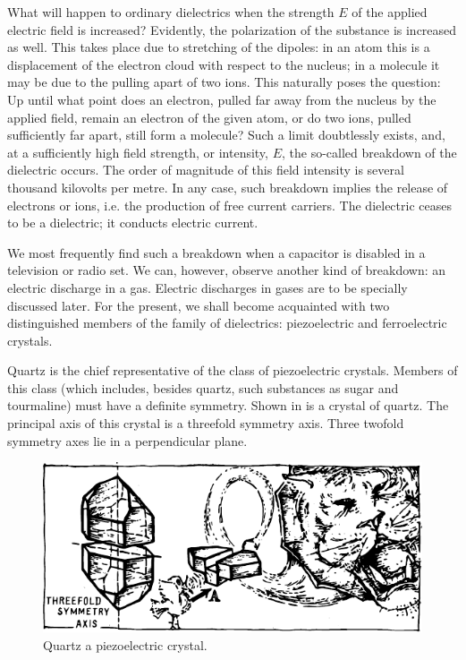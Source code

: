 What will happen to ordinary dielectrics when the strength $E$ of the applied electric field is increased? Evidently, the polarization of the substance is increased as well. This takes place due to stretching of the dipoles: in an atom this is a displacement of the electron cloud with respect to the nucleus; in a molecule it may be due to the pulling apart of two ions. This naturally poses the question: Up until what point does an electron, pulled far away from the nucleus by the applied field, remain an electron of the given atom, or do two ions, pulled sufficiently far apart, still form a molecule? Such a limit doubtlessly exists, and, at a sufficiently high field strength, or intensity, $E$, the so-called breakdown of the dielectric occurs. The order of magnitude of this field intensity is several thousand kilovolts per metre. In any case, such breakdown implies the release of electrons or ions, i.e. the production of free current carriers. The dielectric ceases to be a dielectric; it conducts electric current.

We most frequently find such a breakdown when a capacitor is disabled in a television or radio set. We can, however, observe another kind of breakdown: an electric discharge in a gas. Electric discharges in gases are to be specially discussed later. For the present, we shall become acquainted with two distinguished members of the family of dielectrics: piezoelectric and ferroelectric crystals.

Quartz is the chief representative of the class of piezoelectric crystals. Members of this class (which includes, besides quartz, such substances as sugar and tourmaline) must have a definite symmetry. Shown in  is a crystal of quartz. The principal axis of this crystal is a threefold symmetry axis. Three twofold symmetry axes lie in a perpendicular plane.

\begin{figure}[!ht]
\centering
\includegraphics[width=\textwidth]{figures/fig-02-03.pdf}
\caption{Quartz a piezoelectric crystal.}
\label{fig-2.3}
\end{figure}

